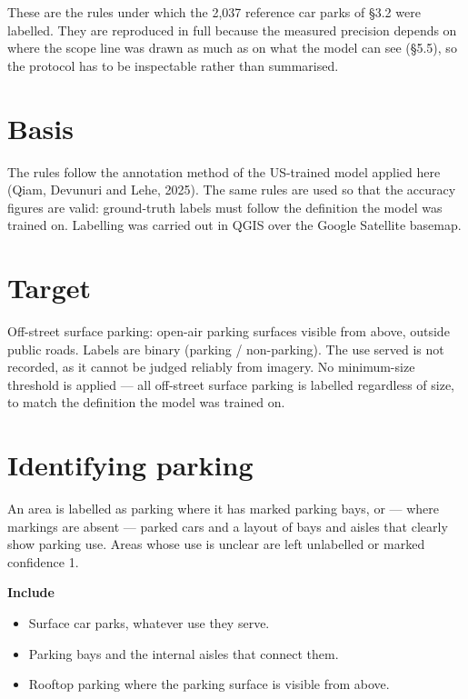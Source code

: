 These are the rules under which the 2,037 reference car parks of §3.2 were labelled. They are reproduced in full because the measured precision depends on where the scope line was drawn as much as on what the model can see (§5.5), so the protocol has to be inspectable rather than summarised.

\hypertarget{basis}{%
\section{Basis}\label{basis}}

The rules follow the annotation method of the US-trained model applied here (Qiam, Devunuri and Lehe, 2025). The same rules are used so that the accuracy figures are valid: ground-truth labels must follow the definition the model was trained on. Labelling was carried out in QGIS over the Google Satellite basemap.

\hypertarget{target}{%
\section{Target}\label{target}}

Off-street surface parking: open-air parking surfaces visible from above, outside public roads. Labels are binary (parking / non-parking). The use served is not recorded, as it cannot be judged reliably from imagery. No minimum-size threshold is applied --- all off-street surface parking is labelled regardless of size, to match the definition the model was trained on.

\hypertarget{identifying-parking}{%
\section{Identifying parking}\label{identifying-parking}}

An area is labelled as parking where it has marked parking bays, or --- where markings are absent --- parked cars and a layout of bays and aisles that clearly show parking use. Areas whose use is unclear are left unlabelled or marked confidence 1.

\textbf{Include}

\begin{itemize}
\tightlist
\item
  Surface car parks, whatever use they serve.
\item
  Parking bays and the internal aisles that connect them.
\item
  Rooftop parking where the parking surface is visible from above.
\end{itemize}


